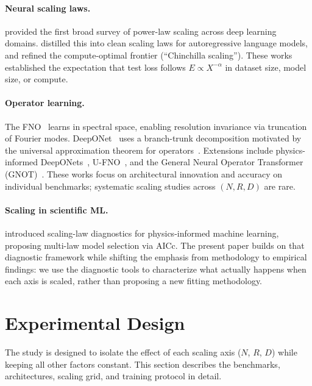 \documentclass[11pt]{article}
\begin{document}
\paragraph{Neural scaling laws.}
\citet{hestness2017deep} provided the first broad survey of power-law
scaling across deep learning domains. \citet{kaplan2020scaling}
distilled this into clean scaling laws for autoregressive language
models, and \citet{hoffmann2022training} refined the compute-optimal
frontier (``Chinchilla scaling''). These works established the
expectation that test loss follows $E \propto X^{-\alpha}$ in
dataset size, model size, or compute.

\paragraph{Operator learning.}
The FNO~\citep{li2021fourier} learns in spectral space, enabling
resolution invariance via truncation of Fourier modes.
DeepONet~\citep{lu2021learning} uses a branch-trunk decomposition
motivated by the universal approximation theorem for
operators~\citep{chen1995universal}.
Extensions include physics-informed
DeepONets~\citep{wang2021learning}, U-FNO~\citep{wen2022ufno}, and
the General Neural Operator Transformer
(GNOT)~\citep{hao2023gnot}.
These works focus on architectural innovation and accuracy on
individual benchmarks; systematic scaling studies across
$(N, R, D)$ are rare.

\paragraph{Scaling in scientific ML.}
\citet{perrier2025scaling} introduced scaling-law diagnostics for
physics-informed machine learning, proposing multi-law model selection
via AICc. The present paper builds on that diagnostic framework while
shifting the emphasis from methodology to empirical findings: we use
the diagnostic tools to characterize what actually happens when each
axis is scaled, rather than proposing a new fitting methodology.


\section{Experimental Design}
\label{sec:design}

The study is designed to isolate the effect of each scaling axis
($N$, $R$, $D$) while keeping all other factors constant.
This section describes the benchmarks, architectures, scaling grid,
and training protocol in detail.
\end{document}
